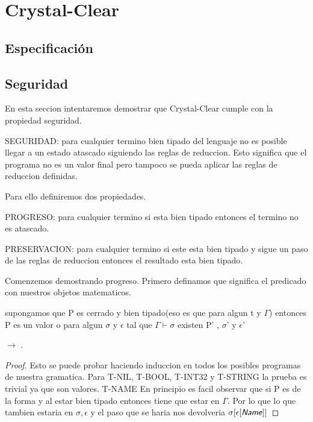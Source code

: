 \setchapterpreamble[u]{\margintoc}
\chapter{Crystal-Clear}

\section{Especificación}

\section{Seguridad}

En esta seccion intentaremos demostrar que Crystal-Clear cumple con la propiedad
seguridad.

\begin{definition}
    SEGURIDAD: para cualquier termino bien tipado del lenguaje no es
    posible llegar a un estado atascado siguiendo las reglas de reduccion.
     Esto significa que el programa no es un valor final pero tampoco se 
    pueda aplicar las reglas de reduccion definidas.
\end{definition}

Para ello definiremos dos propiedades.

\begin{definition}
    PROGRESO: para cualquier termino si esta bien tipado entonces el termino no es atascado.
\end{definition}
\begin{definition}
    PRESERVACION: para cualquier termino si este esta bien tipado y sigue un paso de las reglas
    de reduccion entonces el resultado esta bien tipado.
\end{definition}

Comenzemos demostrando progreso. Primero definamos que significa el predicado
con nuestros objetos matematicos.

\begin{theorem}[Progreso]
    supongamos que P es cerrado y bien  tipado(eso es que
     para algun t y $\Gamma$)
    entonces P es un valor o para algun $\sigma$ y $\epsilon$ tal que
    $\Gamma \vdash \sigma$ existen P' , $\sigma$' y $\epsilon$' 

     $\rightarrow$ .

\end{theorem}
\begin{proof}
Esto se puede probar haciendo induccion en todos los posibles programas de nuestra
gramatica. Para T-NIL, T-BOOL, T-INT32 y T-STRING la prueba es trivial ya que son valores.
T-NAME En principio es facil observar que si P es de la forma 
y al estar bien tipado entonces  tiene que estar en $\Gamma$. Por lo que lo 
que  tambien estaria en $\sigma, \epsilon$ y el paso que se haria nos devolveria
$\sigma[\epsilon[\textsf{\textit{Name}}]]$
\end{proof}

